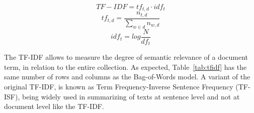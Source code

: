 \documentclass{ieeeaccess}
\begin{document}
\begin {equation}
    TF-IDF=tf_{t,d}\cdot idf_{t}
    \label{eq:tfidf}
\end{equation}
\begin{equation}
    tf_{t,d} = \frac{n_{t,d}}{\sum_{w\in d}^{}n_{w,d}}
    \label{eq:tf}
\end {equation}
\begin {equation}
    idf_{t} = log\frac{N}{df_{t}}
    \label{eq:idf}
\end {equation}


The TF-IDF allows to measure the degree of semantic relevance of a document term, in relation to the entire collection. As expected, Table~\ref{tab:tfidf} has the same number of rows and columns as the Bag-of-Words model. A variant of the original TF-IDF, is known as Term Frequency-Inverse Sentence Frequency (TF-ISF), being widely used in summarizing of texts at sentence level and not at document level like the TF-IDF.

\end{document}

